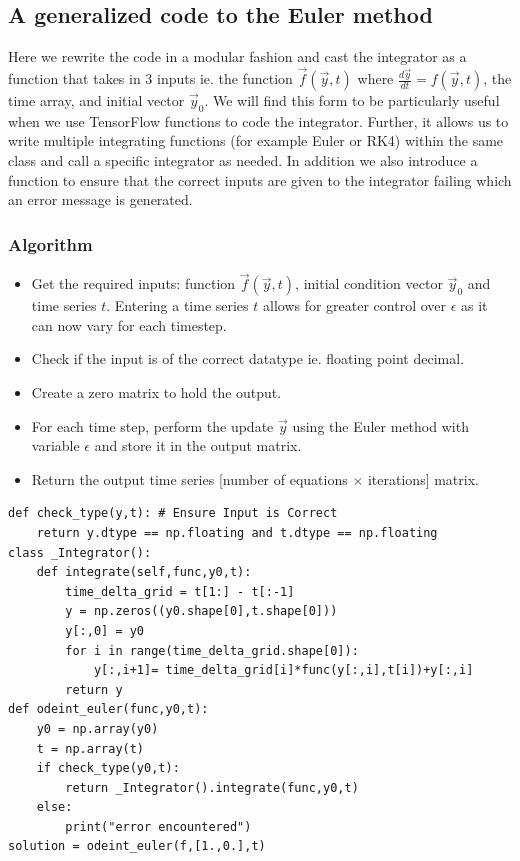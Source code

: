 \documentclass[10pt,letterpaper]{article}
\begin{document}
\subsection*{A generalized code to the Euler method}
Here we rewrite the code in a modular fashion and cast the integrator as a function that takes in 3 inputs ie. the function $\vec{f}(\vec{y},t)$ where $\frac{d\vec{y}}{dt}=f(\vec{y},t)$, the time array, and initial vector $\vec{y}_{0}$. We will find this form to be particularly useful when we use TensorFlow functions to code the integrator. Further, it allows us to write multiple integrating functions (for example Euler or RK4) within the same class and call a specific integrator as needed. In addition we also introduce a function to ensure that the correct inputs are given to the integrator failing which an error message is generated. 

\subsubsection*{Algorithm}

\begin{itemize}
\item Get the required inputs: function $\vec{f}(\vec{y},t)$, initial condition vector $\vec{y}_0$ and time series $t$. Entering a time series $t$ allows for greater control over $\epsilon$ as it can now vary for each timestep. 
\item Check if the input is of the correct datatype ie. floating point decimal.
\item Create a zero matrix to hold the output.
\item For each time step, perform the update $\vec{y}$ using the Euler method with variable $\epsilon$ and store it in the output matrix.
\item Return the output time series [number of equations $\times$ iterations] matrix.
\end{itemize}

\begin{verbatim}
def check_type(y,t): # Ensure Input is Correct
    return y.dtype == np.floating and t.dtype == np.floating
class _Integrator():
    def integrate(self,func,y0,t):
        time_delta_grid = t[1:] - t[:-1]
        y = np.zeros((y0.shape[0],t.shape[0]))
        y[:,0] = y0
        for i in range(time_delta_grid.shape[0]):
            y[:,i+1]= time_delta_grid[i]*func(y[:,i],t[i])+y[:,i]
        return y
def odeint_euler(func,y0,t):
    y0 = np.array(y0)
    t = np.array(t)
    if check_type(y0,t):
        return _Integrator().integrate(func,y0,t)
    else:
        print("error encountered")
solution = odeint_euler(f,[1.,0.],t)
\end{verbatim}
\end{document}
